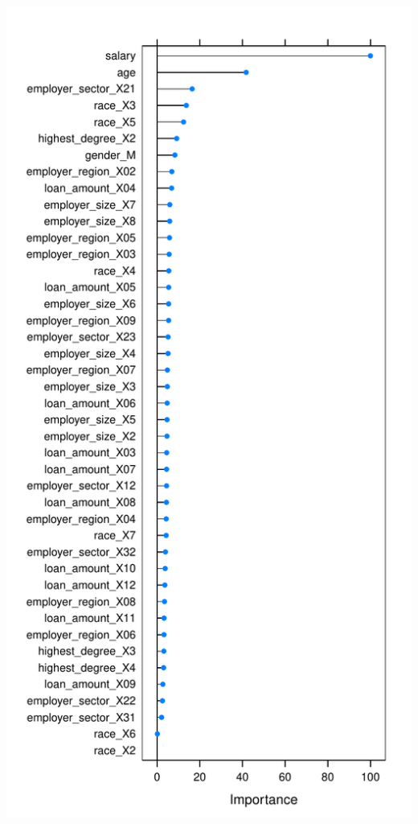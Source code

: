 \documentclass[]{article}
\begin{document}
\includegraphics{Report_Draft_04282019_files/figure-latex/unnamed-chunk-29-1.pdf}
\end{document}
